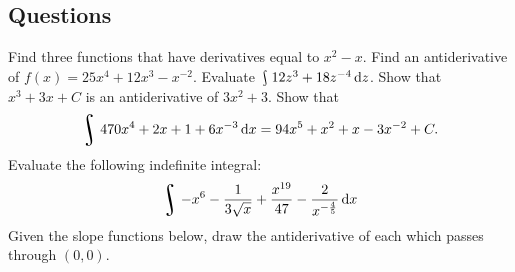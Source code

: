 \subsection*{Questions}
\begin{questions}
  \question Find three functions that have derivatives equal to $ x^2 - x $.
  \question Find an antiderivative of $ f(x) = 25x^4 + 12x^3 - x^{-2} $.
  \question Evaluate $ \rint 12z^3 + 18z^{-4} \dif{z} $.
  \question Show that $ x^3 + 3x + C $ is an antiderivative of $ 3x^2 + 3 $.
  \question Show that
            \begin{equation}
              \rint 470x^4 + 2x + 1 + 6x^{-3} \dif{x} = 94x^5 + x^2 + x - 3x^{-2} + C.
            \end{equation}
  \question Evaluate the following indefinite integral:
             \begin{displaymath}
               \rint -x^6 - \frac{1}{3\sqrt{x}} + \frac{x^{19}}{47} - \frac{2}{x^{-\frac{4}{5}}} \dif{x}
             \end{displaymath}
  \question Given the slope functions below, draw the antiderivative of each which passes through $ (0,0) $.
\end{questions}
